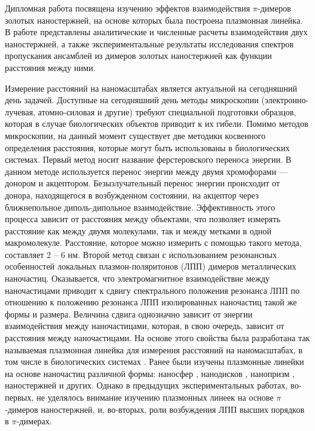
Дипломная работа посвящена изучению эффектов взаимодействия $ \pi $-димеров золотых наностержней, на основе которых была построена плазмонная линейка. В работе представлены аналитические и численные расчеты взаимодействия двух наностержней, а также экспериментальные результаты исследования спектров пропускания ансамблей из димеров золотых наностержней как функции расстояния между ними.

Измерение расстояний на наномасштабах является актуальной на сегодняшний день задачей. Доступные на сегодняшний день методы микроскопии (электронно-лучевая, атомно-силовая и другие) требуют специальной подготовки образцов, которая в случае биологических объектов приводит к их гибели. Помимо методов микроскопии, на данный момент существует две методики косвенного определения расстояния, которые могут быть использованы в биологических системах. Первый метод носит название ферстеровского переноса энергии. В данном методе используется перенос энергии между двумя хромофорами --- донором и акцептором. Безызлучательный перенос энергии происходит от донора, находящегося в возбужденном состоянии, на акцептор через ближнепольное диполь-дипольное взаимодействие. Эффективность этого процесса зависит от расстояния между объектами, что позволяет измерять расстояние как между двумя молекулами, так и между метками в одной макромолекуле. Расстояние, которое можно измерить с помощью такого метода, составляет 2 -- 6 нм. Второй метод связан с использованием резонансных особенностей локальных плазмон-поляритонов (ЛПП) димеров металлических наночастиц. Оказывается, что электромагнитное взаимодействие между наночастицами приводит к сдвигу спектрального положения резонанса ЛПП по отношению к положению резонанса ЛПП изолированных наночастиц такой же формы и размера. Величина сдвига однозначно зависит от энергии взаимодействия между наночастицами, которая, в свою очередь, зависит от расстояния между наночастицами. На основе этого свойства была разработана так называемая плазмонная линейка для измерения расстояний на наномасштабах, в том числе в биологических системах \cite{DNA}. Ранее были изучены плазмонные линейки на основе наночастиц различной формы: наносфер \cite{nanospheres}, нанодисков \cite{plasonrulereq}, нанопризм \cite{nanoprism}, наностержней \cite{nanorods} и других. Однако в предыдущих экспериментальных работах, во-первых, не уделялось внимание изучению плазмонных линеек на основе $ \pi $-димеров наностержней, и, во-вторых, роли возбуждения ЛПП высших порядков в $ \pi $-димерах.

